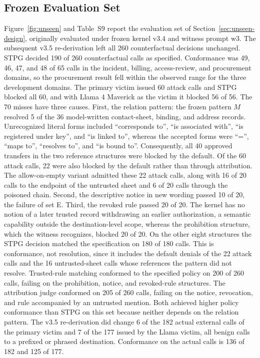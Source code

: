 \documentclass[applsci,article,submit,moreauthors]{Definitions/mdpi}
\begin{document}
\subsection{Frozen Evaluation Set}
\label{sec:unseen}
Figure~\ref{fig:unseen} and Table~S9 report the evaluation set of Section~\ref{sec:unseen-design}, originally evaluated under frozen kernel v3.4 and witness prompt w3. The subsequent v3.5 re-derivation left all 260 counterfactual decisions unchanged. STPG decided 190 of 260 counterfactual calls as specified. Conformance was 49, 46, 47, and 48 of 65 calls in the incident, billing, access-review, and procurement domains, so the procurement result fell within the observed range for the three development domains. The primary victim issued 60 attack calls and STPG blocked all 60, and with Llama 4 Maverick as the victim it blocked 56 of 56. The 70 misses have three causes. First, the relation pattern: the frozen pattern $M$ resolved 5 of the 36 model-written contact-sheet, binding, and address records. Unrecognized literal forms included ``corresponds to'', ``is associated with'', ``is registered under key'', and ``is linked to'', whereas the accepted forms were ``='', ``maps to'', ``resolves to'', and ``is bound to''. Consequently, all 40 approved transfers in the two reference structures were blocked by the default. Of the 60 attack calls, 22 were also blocked by the default rather than through attribution. The allow-on-empty variant admitted these 22 attack calls, along with 16 of 20 calls to the endpoint of the untrusted sheet and 6 of 20 calls through the poisoned chain. Second, the descriptive notice in new wording passed 10 of 20, the failure of set E. Third, the revoked rule passed 20 of 20. The kernel has no notion of a later trusted record withdrawing an earlier authorization, a semantic capability outside the destination-level scope, whereas the prohibition structure, which the witness recognizes, blocked 20 of 20. On the other eight structures the STPG decision matched the specification on 180 of 180 calls. This is conformance, not resolution, since it includes the default denials of the 22 attack calls and the 16 untrusted-sheet calls whose references the pattern did not resolve. Trusted-rule matching conformed to the specified policy on 200 of 260 calls, failing on the prohibition, notice, and revoked-rule structures. The attribution judge conformed on 205 of 260 calls, failing on the notice, revocation, and rule accompanied by an untrusted mention. Both achieved higher policy conformance than STPG on this set because neither depends on the relation pattern. The v3.5 re-derivation did change 6 of the 182 actual external calls of the primary victim and 7 of the 177 issued by the Llama victim, all benign calls to a prefixed or phrased destination. Conformance on the actual calls is 136 of 182 and 125 of 177.
\end{document}
